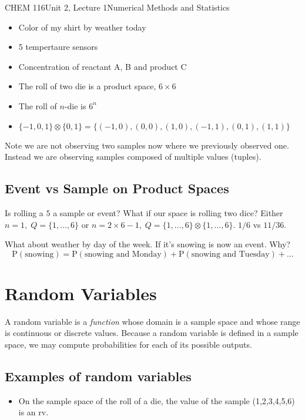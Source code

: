 \documentclass{article}
\renewcommand{\Pr}{\textrm{P}}
\begin{document}
\begin{tdoc}{CHEM 116}{Unit 2, Lecture 1}{Numerical Methods and Statistics}
\begin{itemize}

\item Color of my shirt by weather today
\item 5 tempertaure sensors
\item Concentration of reactant A, B and product C
\item The roll of two die is a product space, $6\times 6$
\item The roll of $n$-die is $6^n$
\item $\{-1,0,1\} \otimes \{0,1\} = \{(-1,0), (0,0), (1,0), (-1,1), (0,1), (1,1)\}$

\end{itemize}

Note we are not observing two samples now where we previously observed
one. Instead we are observing samples composed of multiple values
(tuples).

\subsection{Event vs Sample on Product Spaces}
Is rolling a $5$ a sample or event? What if our space is rolling two
dice? Either $n=1,\; Q=\{1,\ldots,6\}$ or $n=2\times 6 - 1,\; Q=\{1,\ldots,6\} \otimes \{1,\ldots,6\}$.
$1/6$ vs $11/36$.

What about weather by day of the week. If it's snowing is now an
event. Why?
\[
\Pr(\textrm{snowing}) = \Pr(\textrm{snowing and Monday}) + \Pr(\textrm{snowing and Tuesday}) + \ldots
\]

\section{Random Variables}

A random variable is a \emph{function} whose domain is a sample space
and whose range is continuous or discrete values. Because a random
variable is defined in a sample space, we may compute probabilities
for each of its possible outputs.

\subsection{Examples of random variables}

\begin{itemize}

\item On the sample space of the roll of a die, the value of the
  sample (1,2,3,4,5,6) is an rv.



\end{itemize}
\end{tdoc}
\end{document}
